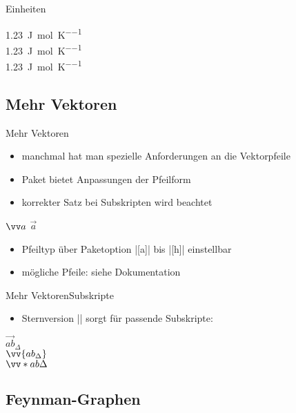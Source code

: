 \documentclass[
	vorläufig=false,
	datum=2022-11-09,
	titel={Mathematiksatz},
	web=false,
	max,
	aspectratio=1610,
]{../tex/latexkurs-slides}
\begin{document}
\begin{frame}[fragile]{Einheiten}
\begin{LTXexample}[width=.4\textwidth]
\SI{1.23}{\joule\per\mole\per\kelvin}
\\ 
\SI{1.23}{\joule\per\mole\per\kelvin}
\\ 
\SI{1.23}{\joule\per\mole\per\kelvin}
\end{LTXexample}
\end{frame}


\subsection{Mehr Vektoren}
\begin{frame}[fragile]{Mehr Vektoren}
\begin{itemize}
\item manchmal hat man spezielle Anforderungen an die Vektorpfeile
\item Paket  bietet Anpassungen der Pfeilform
\item korrekter Satz bei Subskripten wird beachtet
\end{itemize}
\begin{LTXexample}[preset={\obeylines}]
$\vv a$
$\vec a$
\end{LTXexample}
\begin{itemize}
\item Pfeiltyp über Paketoption |[a]| bis |[h]| einstellbar
\item mögliche Pfeile: siehe Dokumentation
\end{itemize}
\end{frame}

\begin{frame}[fragile]{Mehr Vektoren}{Subskripte}
\begin{itemize}
\item Sternversion |\vv*{}{}| sorgt für passende Subskripte:
\end{itemize}
\begin{LTXexample}[preset={\obeylines}]
$\vec{ab}_{\Delta}$\\[-2ex]
$\vv {{ab}_{\Delta}}$\\[-2ex]
$\vv*{ab}{\Delta}$
\end{LTXexample}
\end{frame}


\subsection{Feynman-Graphen}
\iffalse
\end{document}

